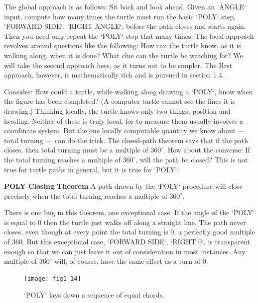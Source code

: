 \documentclass{book}
\begin{document}
The global approach is as follows: Sit back and look ahead. Given an
\textsc{`ANGLE`} input, compute how many times the turtle must run the basic
\textsc{`POLY`} step, \textsc{`FORWARD SIDE`}, \textsc{`RIGHT ANGLE`}, before the path closes and
starts again. Then you need only repeat the \textsc{`POLY`} step that many times.
The local approach revolves around questions like the following: How can
the turtle know, as it is walking along, when it is done? What clue can
the turtle be watching for? We will take the second approach here, as it
turns out to be simpler. The Hrst approach, however, is mathematically
rich and is pursued in section 1.4.

Consider: How could a turtle, while walking along drawing a \textsc{`POLY`},
know when the figure has been completed? (A computer turtle cannot
see the lines it is drawing.) Thinking locally, the turtle knows only
two things, position and heading. Neither of these is truly local, for to
measure them usually involves a coordinate system. But the one locally
computable quantity we know about --- total turning --- can do the trick.
The closed-path theorem says that if the path closes, then total turning
must be a multiple of $360^{\circ}$. How about the converse: If the total turning
reaches a multiple of $360^{\circ}$, will the path be closed? This is not true for
turtle paths in general, but it is true for \textsc{`POLY`}:

\vspace{0.5cm}

\noindent \textbf{POLY Closing Theorem} A path drawn by the \textsc{`POLY`} procedure will close
precisely when the total turning reaches a multiple of $360^{\circ}$.

\vspace{0.5cm}

There is one bug in this theorem, one exceptional case: If the angle of
the \textsc{`POLY`} is equal to 0 then the turtle just walks off along a straight
line. The path never closes, even though at every point the total
turning is 0, a perfectly good multiple of 360. But this exceptional case,
\textsc{`FORWARD SIDE`}, \textsc{`RIGHT 0`}, is transparent enough so that we can just leave
it out of consideration in most instances. Any multiple of $360^{\circ}$ will, of
course, have the same effect as a turn of 0.

\begin{figure}
\begin{center}
\texttt{[image: fig1-14]}
\caption{\textsc{`POLY`} lays down a sequence of equal chords.}
\end{center}
\end{figure}
\end{document}
